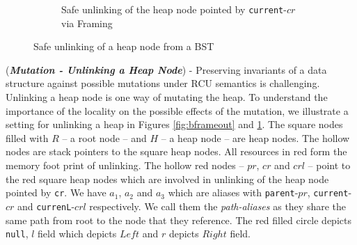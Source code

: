 \begin{figure}[H]
\begin{subfigure}[b]{.4\linewidth}

 \caption{Safe unlinking of the heap node pointed by \texttt{current}-$cr$ via \textsf{Framing}}
 \label{fig:bunlinkframeout}
\end{subfigure}
\caption{Safe unlinking of a heap node from a \textsf{BST}}
 \label{fig:unlkappndx}\vspace{-2mm}
 \end{figure}

(\textit{\textbf{Mutation - Unlinking a Heap Node}}) - Preserving invariants of a data structure against possible mutations under \textsf{RCU} semantics is challenging. Unlinking a heap node is one way of mutating the heap. To understand the importance of the locality on the possible effects of the mutation, we illustrate a setting for unlinking a heap in Figures  \ref{fig:bframeout} and \ref{fig:bunlinkframeout}. The square nodes filled with $R$ -- a root node -- and $H$ -- a heap node -- are heap nodes. The hollow nodes are stack pointers to the square heap nodes. All resources in red form the memory foot print of unlinking. The hollow red nodes -- $pr$, $cr$ and $crl$ -- point to the red square heap nodes which are involved in unlinking of the heap node pointed by \texttt{cr}. We have $a_1$, $a_2$ and $a_3$ which are aliases with \texttt{parent}-$pr$, \texttt{current}-$cr$ and \texttt{currenL}-$crl$ respectively. We call them the \textit{path-aliases} as they share the same path from root to the node that they reference. The red filled circle depicts \texttt{null}, $l$ field which depicts $Left$ and $r$ depicts $Right$ field.

